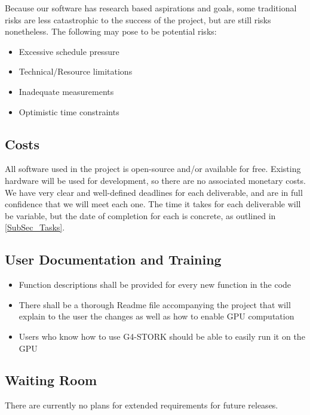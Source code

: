 \documentclass[12pt]{article}
\begin{document}
Because our software has research based aspirations and goals, some traditional risks are less catastrophic to the success of the project, but are still risks nonetheless. The following may pose to be potential risks:\\

\begin{itemize}
	\item Excessive schedule pressure
	\item Technical/Resource limitations
	\item Inadequate measurements
	\item Optimistic time constraints
\end{itemize}

\subsection{Costs} %
All software used in the project is open-source and/or available for free. Existing hardware will be used for development, so there are no associated monetary costs.\\

We have very clear and well-defined deadlines for each deliverable, and are in full confidence that we will meet each one. The time it takes for each deliverable will be variable, but the date of completion for each is concrete, as outlined in \ref{SubSec_Tasks}.

\subsection{User Documentation and Training} %
\begin{itemize}
	\item Function descriptions shall be provided for every new function in the code
	\item There shall be a thorough Readme file accompanying the project that will explain to the user the changes as well as how to enable GPU computation
	\item Users who know how to use G4-STORK should be able to easily run it on the GPU
\end{itemize}

\subsection{Waiting Room} %
There are currently no plans for extended requirements for future releases.
\end{document}
